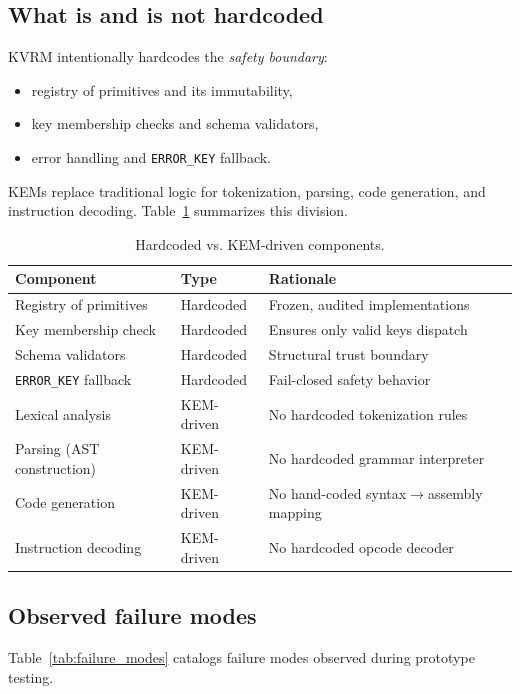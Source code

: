 \documentclass[11pt]{article}
\begin{document}
\subsection{What is and is not hardcoded}
KVRM intentionally hardcodes the \emph{safety boundary}:
\begin{itemize}[leftmargin=*]
  \item registry of primitives and its immutability,
  \item key membership checks and schema validators,
  \item error handling and \texttt{ERROR\_KEY} fallback.
\end{itemize}
KEMs replace traditional logic for tokenization, parsing, code generation, and instruction decoding.
Table~\ref{tab:hardcoded_vs_kem} summarizes this division.

\begin{table}[h]
\centering
\caption{Hardcoded vs. KEM-driven components.}
\label{tab:hardcoded_vs_kem}
\begin{tabular}{p{4.2cm}p{5.3cm}p{5.0cm}}
\toprule
Component & Type & Rationale \\
\midrule
Registry of primitives & Hardcoded & Frozen, audited implementations \\
Key membership check & Hardcoded & Ensures only valid keys dispatch \\
Schema validators & Hardcoded & Structural trust boundary \\
\texttt{ERROR\_KEY} fallback & Hardcoded & Fail-closed safety behavior \\
\midrule
Lexical analysis & KEM-driven & No hardcoded tokenization rules \\
Parsing (AST construction) & KEM-driven & No hardcoded grammar interpreter \\
Code generation & KEM-driven & No hand-coded syntax$\rightarrow$assembly mapping \\
Instruction decoding & KEM-driven & No hardcoded opcode decoder \\
\bottomrule
\end{tabular}
\end{table}

\subsection{Observed failure modes}
Table~\ref{tab:failure_modes} catalogs failure modes observed during prototype testing.
\end{document}
